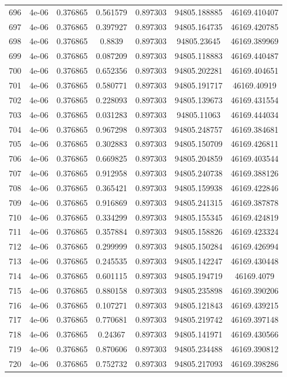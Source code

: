 \begin{table}
\begin{tabular*}{\linewidth}{c|c|c|c|c|c|c}
696 & 4e-06 & 0.376865 & 0.561579 & 0.897303 & 94805.188885 & 46169.410407\\
697 & 4e-06 & 0.376865 & 0.397927 & 0.897303 & 94805.164735 & 46169.420785\\
698 & 4e-06 & 0.376865 & 0.8839 & 0.897303 & 94805.23645 & 46169.389969\\
699 & 4e-06 & 0.376865 & 0.087209 & 0.897303 & 94805.118883 & 46169.440487\\
700 & 4e-06 & 0.376865 & 0.652356 & 0.897303 & 94805.202281 & 46169.404651\\
701 & 4e-06 & 0.376865 & 0.580771 & 0.897303 & 94805.191717 & 46169.40919\\
702 & 4e-06 & 0.376865 & 0.228093 & 0.897303 & 94805.139673 & 46169.431554\\
703 & 4e-06 & 0.376865 & 0.031283 & 0.897303 & 94805.11063 & 46169.444034\\
704 & 4e-06 & 0.376865 & 0.967298 & 0.897303 & 94805.248757 & 46169.384681\\
705 & 4e-06 & 0.376865 & 0.302883 & 0.897303 & 94805.150709 & 46169.426811\\
706 & 4e-06 & 0.376865 & 0.669825 & 0.897303 & 94805.204859 & 46169.403544\\
707 & 4e-06 & 0.376865 & 0.912958 & 0.897303 & 94805.240738 & 46169.388126\\
708 & 4e-06 & 0.376865 & 0.365421 & 0.897303 & 94805.159938 & 46169.422846\\
709 & 4e-06 & 0.376865 & 0.916869 & 0.897303 & 94805.241315 & 46169.387878\\
710 & 4e-06 & 0.376865 & 0.334299 & 0.897303 & 94805.155345 & 46169.424819\\
711 & 4e-06 & 0.376865 & 0.357884 & 0.897303 & 94805.158826 & 46169.423324\\
712 & 4e-06 & 0.376865 & 0.299999 & 0.897303 & 94805.150284 & 46169.426994\\
713 & 4e-06 & 0.376865 & 0.245535 & 0.897303 & 94805.142247 & 46169.430448\\
714 & 4e-06 & 0.376865 & 0.601115 & 0.897303 & 94805.194719 & 46169.4079\\
715 & 4e-06 & 0.376865 & 0.880158 & 0.897303 & 94805.235898 & 46169.390206\\
716 & 4e-06 & 0.376865 & 0.107271 & 0.897303 & 94805.121843 & 46169.439215\\
717 & 4e-06 & 0.376865 & 0.770681 & 0.897303 & 94805.219742 & 46169.397148\\
718 & 4e-06 & 0.376865 & 0.24367 & 0.897303 & 94805.141971 & 46169.430566\\
719 & 4e-06 & 0.376865 & 0.870606 & 0.897303 & 94805.234488 & 46169.390812\\
720 & 4e-06 & 0.376865 & 0.752732 & 0.897303 & 94805.217093 & 46169.398286\\
\end{tabular*}
\end{table}

